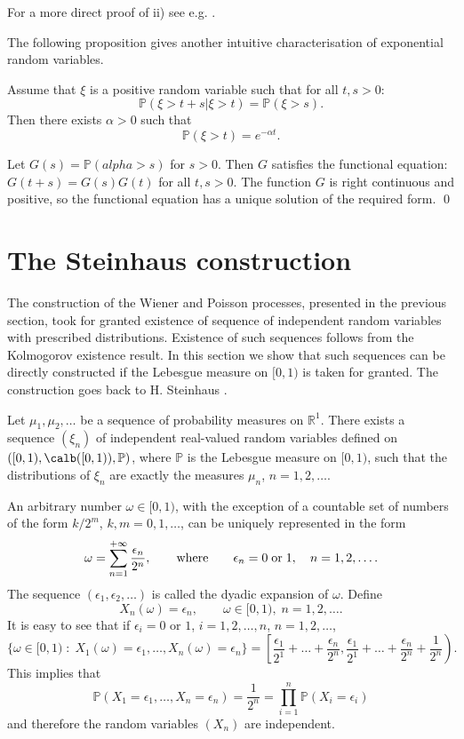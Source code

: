 \documentclass[preprint]{imsart}
\def\P{\mathbb P}
\def\R{\mathbb R}
\begin{document}
{\noindent For a more direct proof of ii) see e.g. \cite{billingsley}.
\vspace{2mm}

\noindent The following proposition gives another intuitive characterisation of
exponential random variables.
\begin{Proposition}
Assume that $\xi$ is a positive random variable such that
for all $t,s>0$:
$$
\P(\xi>t+s|\xi>t)=\P(\xi>s).
$$
Then there exists $\alpha >0$ such that
\begin{equation}\label{exponential}
\P(\xi >t)=e^{-\alpha t}.
\end{equation}
\end{Proposition}

 Let $G(s)=\P(alpha >s)$ for $s>0$. Then $G$ satisfies the
functional equation: $G(t+s)=G(s)G(t)$
for all $t,s>0$. The function $G$ is right continuous
and positive, so the functional equation has a unique
solution of the required form. \qed


\section{The Steinhaus construction}

The construction of the Wiener and Poisson processes, presented in the previous section, took for granted existence of
sequence of independent random variables with prescribed  distributions. Existence of such sequences  follows from
the Kolmogorov existence result.  In this section we show
that such sequences can be directly  constructed if the Lebesgue
measure on $[0,1)$ is taken for granted. The construction goes
back to H. Steinhaus \cite{bib10}.

\begin{Theorem}\label{steinh}
  Let $\mu_1, \mu_2,\ldots$ be a sequence of probability measures
on $\R^1$. There exists a sequence $(\xi_n)$ of independent
real-valued random variables defined on $([0,1), \calb ([0,1)),
\P)$, where $\P$ is the Lebesgue measure on $[0,1)$, such that
the distributions of $\xi_n$ are exactly the measures $\mu_n$,
$n=1,2,\ldots$.
\end{Theorem}

An arbitrary number $\omega\in [0,1)$, with the exception of a
countable set of numbers of the form $k/2^m$, $k,m=0,1,\ldots$,
can be uniquely represented in the form
$$
\omega= \sum_{n=1}^{+\infty} \frac{\epsilon_n}{2^n},
\qquad {\rm where}\qquad \epsilon_n=0\; {\rm or\;} 1,
\quad n=1,2,\ldots.
$$
The sequence $(\epsilon_1, \epsilon_2,\ldots)$ is called the
dyadic expansion of $\omega$. Define
$$
X_n(\omega)=\epsilon_n,\qquad \omega\in [0,1),\; n=1,2,\ldots.
$$
It is easy to see that if $\epsilon_i=0$ or $1$, $i=1,2,\ldots,
n$,
$n=1,2,\ldots$,
$$
\{\omega\in [0,1)\; :\;
X_1(\omega)=\epsilon_1,\ldots,
X_n(\omega)=\epsilon_n\} =
\left[ \frac{\epsilon_1}{2^1}+\ldots +\frac{\epsilon_n}{2^n},
\frac{\epsilon_1}{2^1}+\ldots +\frac{\epsilon_n}{2^n}
+\frac{1}{2^n}\right).
$$
This implies that
$$\P(X_1=\epsilon_1,\ldots, X_n=\epsilon_n)=
\frac{1}{2^n}=\prod_{i=1}^n \P(X_i=\epsilon_i)
$$
and therefore the random variables $(X_n)$ are independent.


}
\end{document}
